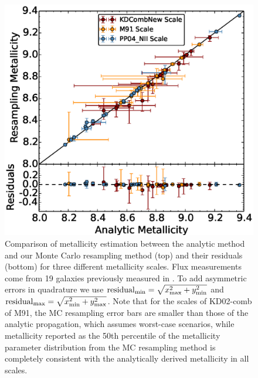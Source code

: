 \documentclass{emulateapj}
\begin{document}
\begin{figure}[ht!]
  \includegraphics[width=1.2\columnwidth]{abcomparison6.eps}
   \caption{Comparison of metallicity estimation between the analytic method and our Monte Carlo resampling method (top) and their residuals (bottom) for three different metallicity scales. Flux measurements come from 19 galaxies previously measured in \citet{modjaz11}. To add asymmetric errors in quadrature we use $\mathrm{residual}_{\rm min}=\sqrt {x_{\rm max}^2 + y_{\rm min}^2}$ and $\mathrm{residual}_{\rm max}=\sqrt {x_{\rm min}^2 + y_{\rm max}^2}$. Note that for the scales of KD02-comb of M91,  the MC resampling error bars are smaller than those of the analytic propagation, which assumes worst-case scenarios, while metallicity reported as the 50th percentile of the metallicity parameter distribution from the MC resampling method is completely consistent with the analytically derived metallicity in all scales.}
 \label{comp_anal_MC}
\end{figure}




\end{document}
